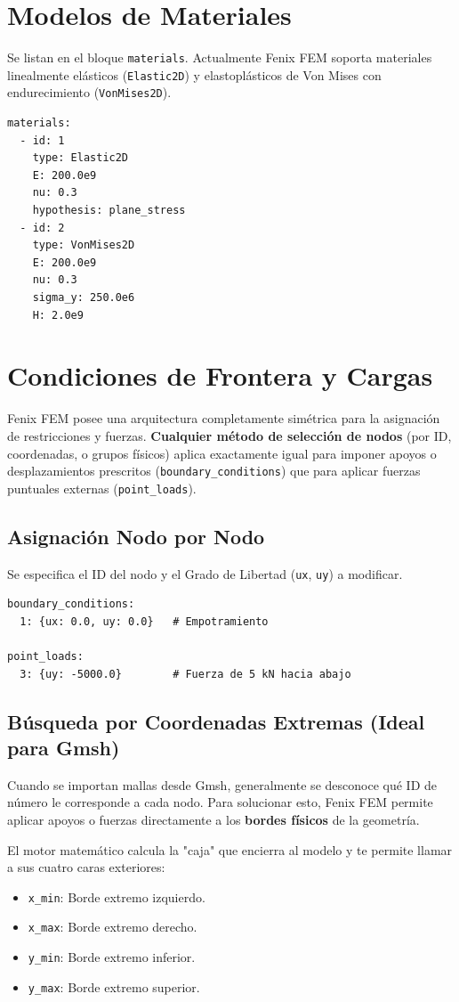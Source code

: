 \documentclass[12pt,a4paper]{article}
\begin{document}
\section{Modelos de Materiales}
Se listan en el bloque \texttt{materials}. Actualmente Fenix FEM soporta materiales linealmente elásticos (\texttt{Elastic2D}) y elastoplásticos de Von Mises con endurecimiento (\texttt{VonMises2D}).
\begin{lstlisting}
materials:
  - id: 1
    type: Elastic2D
    E: 200.0e9
    nu: 0.3
    hypothesis: plane_stress
  - id: 2
    type: VonMises2D
    E: 200.0e9
    nu: 0.3
    sigma_y: 250.0e6
    H: 2.0e9
\end{lstlisting}

\section{Condiciones de Frontera y Cargas}
Fenix FEM posee una arquitectura completamente simétrica para la asignación de restricciones y fuerzas. \textbf{Cualquier método de selección de nodos} (por ID, coordenadas, o grupos físicos) aplica exactamente igual para imponer apoyos o desplazamientos prescritos (\texttt{boundary\_conditions}) que para aplicar fuerzas puntuales externas (\texttt{point\_loads}).

\subsection{Asignación Nodo por Nodo}
Se especifica el ID del nodo y el Grado de Libertad (\texttt{ux}, \texttt{uy}) a modificar.
\begin{lstlisting}
boundary_conditions:
  1: {ux: 0.0, uy: 0.0}   # Empotramiento

point_loads:
  3: {uy: -5000.0}        # Fuerza de 5 kN hacia abajo
\end{lstlisting}

\subsection{Búsqueda por Coordenadas Extremas (Ideal para Gmsh)}
Cuando se importan mallas desde Gmsh, generalmente se desconoce qué ID de número le corresponde a cada nodo. Para solucionar esto, Fenix FEM permite aplicar apoyos o fuerzas directamente a los \textbf{bordes físicos} de la geometría.

El motor matemático calcula la "caja" que encierra al modelo y te permite llamar a sus cuatro caras exteriores:
\begin{itemize}
    \item \texttt{x\_min}: Borde extremo izquierdo.
    \item \texttt{x\_max}: Borde extremo derecho.
    \item \texttt{y\_min}: Borde extremo inferior.
    \item \texttt{y\_max}: Borde extremo superior.
\end{itemize}
\end{document}
